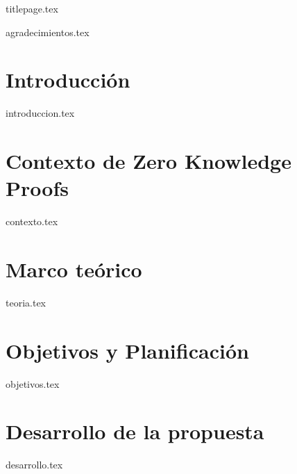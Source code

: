\documentclass[14pt]{extreport}
\def\blankpage{%
      \clearpage%
      \thispagestyle{empty}%
      \addtocounter{page}{-1}%
      \null%
      \clearpage}
\let\listoftableandfigures\listoftables
\begin{document}

\thispagestyle{empty}
{titlepage.tex}

\blankpage


\thispagestyle{empty}
{agradecimientos.tex}


\renewcommand*\contentsname{Índice de contenidos}
\tableofcontents
{}
\newpage
\listoftableandfigures
\newpage


\setcounter{page}{1}
\chapter{Introducción}
{introduccion.tex}


\chapter{Contexto de Zero Knowledge Proofs}
{contexto.tex}


\chapter{Marco teórico} \label{sec:teoria}
{teoria.tex}


\chapter{Objetivos y Planificación}
{objetivos.tex}


\chapter{Desarrollo de la propuesta}
{desarrollo.tex}
\end{document}
